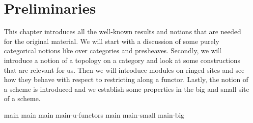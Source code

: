\chapter{Preliminaries}

This chapter introduces all the well-known results and notions that are needed for the original material.
We will start with a discussion of some purely categorical notions like over categories and presheaves.
Secondly, we will introduce a notion of a topology on a category and look at some constructions that are relevant for us.
Then we will introduce modules on ringed sites and see how they behave with respect to restricting along a functor.
Lastly, the notion of a scheme is introduced and we establish some properties in the big and small site of a scheme.


{main}
{main}
{main}
{main-u-functors}
{main}
{main-small}
{main-big}